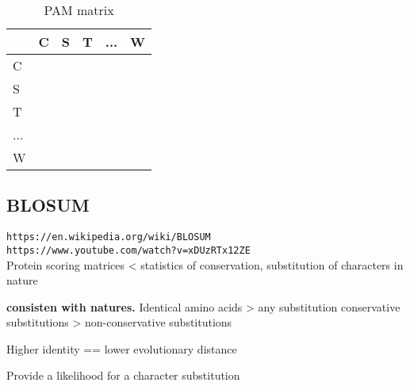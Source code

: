 \documentclass[11pt]{article}
\begin{document}
\begin{table}[ht]
	\caption{PAM matrix}
	\label{tab:PAM_example}
	\centering

	\begin{tabular}{l|ccccc}
	\hline

	\hline
		   & C & S & T & ... & W \\
	\hline
	 	C  &   &   &   &   & \\
	 	S  &   &   &   &   & \\
	 	T  &   &   &   &   & \\
	 	...&   &   &   &   & \\
	 	W  &   &   &   &   & \\
	\hline
	\end{tabular}
\end{table}






















\subsection{BLOSUM} %
\label{sub:blosum}
\texttt{https://en.wikipedia.org/wiki/BLOSUM}\\
\texttt{https://www.youtube.com/watch?v=xDUzRTx12ZE}\\
Protein scoring matrices < statistics of conservation, substitution of characters in nature

\textbf{consisten with natures.}
Identical amino acids > any substitution
conservative substitutions > non-conservative substitutions 

Higher identity == lower evolutionary distance

Provide a likelihood for a character substitution
\end{document}
